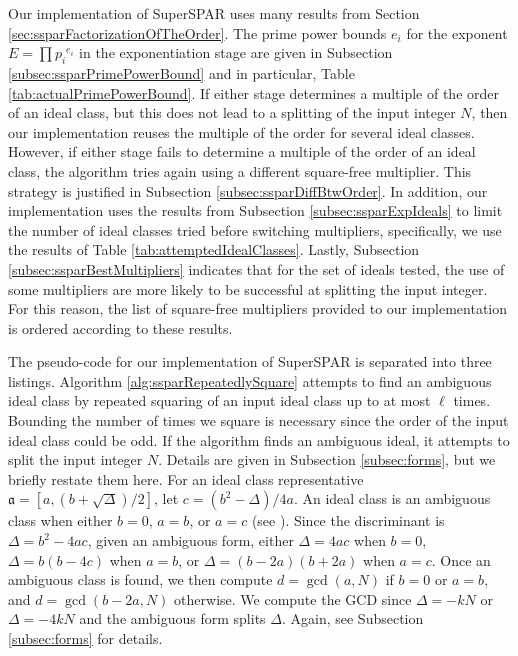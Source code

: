 \documentclass{ucalgthes1}
\theoremstyle{definition}
\newcommand{\ideal}{\mathfrak}
\begin{document}
Our implementation of SuperSPAR uses many results from Section \ref{sec:ssparFactorizationOfTheOrder}.  The prime power bounds $e_i$ for the exponent $E = \prod {p_i}^{e_i}$ in the exponentiation stage are given in Subsection \ref{subsec:ssparPrimePowerBound} and in particular, Table \ref{tab:actualPrimePowerBound}.  If either stage determines a multiple of the order of an ideal class, but this does not lead to a splitting of the input integer $N$, then our implementation reuses the multiple of the order for several ideal classes.  However, if either stage fails to determine a multiple of the order of an ideal class, the algorithm tries again using a different square-free multiplier.  This strategy is justified in Subsection \ref{subsec:ssparDiffBtwOrder}.  In addition, our implementation uses the results from Subsection \ref{subsec:ssparExpIdeals} to limit the number of ideal classes tried before switching multipliers, specifically, we use the results of Table \ref{tab:attemptedIdealClasses}.  Lastly, Subsection \ref{subsec:ssparBestMultipliers} indicates that for the set of ideals tested, the use of some multipliers are more likely to be successful at splitting the input integer.  For this reason, the list of square-free multipliers provided to our implementation is ordered according to these results.

The pseudo-code for our implementation of SuperSPAR is separated into three listings.  Algorithm \ref{alg:ssparRepeatedlySquare} attempts to find an ambiguous ideal class by repeated squaring of an input ideal class up to at most $\ell$ times.  Bounding the number of times we square is necessary since the order of the input ideal class could be odd.  If the algorithm finds an ambiguous ideal, it attempts to split the input integer $N$.  Details are given in Subsection \ref{subsec:forms}, but we briefly restate them here.  For an ideal class representative $\ideal a = [a, (b + \sqrt\Delta)/2]$, let $c = (b^2 - \Delta)/4a$.  An ideal class is an ambiguous class when either $b = 0$, $a = b$, or $a = c$ (see \cite[p.303]{Schnorr1984}).  Since the discriminant is $\Delta = b^2 - 4ac$, given an ambiguous form, either $\Delta = 4ac$ when $b = 0$, $\Delta = b(b-4c)$ when $a = b$, or $\Delta = (b-2a)(b+2a)$ when $a = c$.  Once an ambiguous class is found, we then compute $d = \gcd(a, N)$ if $b = 0$ or $a = b$, and $d = \gcd(b-2a, N)$ otherwise.  We compute the GCD since $\Delta = -kN$ or $\Delta = -4kN$ and the ambiguous form splits $\Delta$.  Again, see Subsection \ref{subsec:forms} for details.
\end{document}
